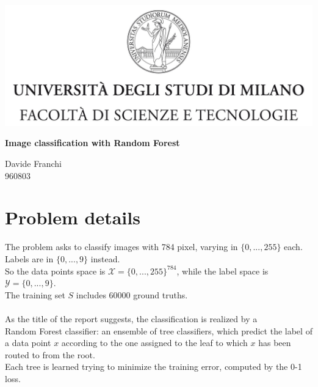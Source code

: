 \documentclass[12pt]{article}
\newcommand{\singlespace}{\vspace{5 mm}}
\newcommand{\triplespace}{\vspace{15 mm}}
\begin{document}

\begin{center}
\includegraphics[scale=1]{Images/tesiSCIENZE_TECNOLOGIE.jpg}
\end{center}



\begin{center}
\triplespace

\begin{Huge}
\textbf{Image classification with Random Forest}
\end{Huge}

\triplespace

\begin{Large}
Davide Franchi\\
\singlespace
960803
\end{Large}
\end{center}


\newpage
\tableofcontents
\newpage
\section{Problem details}
The problem asks to classify images with 784 pixel, varying in $\{0, ..., 255\}$ each. Labels are in $\{0, ..., 9\}$ instead.\\
So the data points space is $\mathcal{X} = \{0, ..., 255\}^{784}$, while the label space is $\mathcal{Y} = \{0, ..., 9\}$.\\
The training set $S$ includes 60000 ground truths.\\\\
As the title of the report suggests, the classification is realized by a\\ Random Forest classifier: an ensemble of tree classifiers, which predict the label of a data point $x$ according to the one assigned to the leaf to which $x$ has been routed to from the root.\\
Each tree is learned trying to minimize the training error, computed by the 0-1 loss.
\newpage
\end{document}
